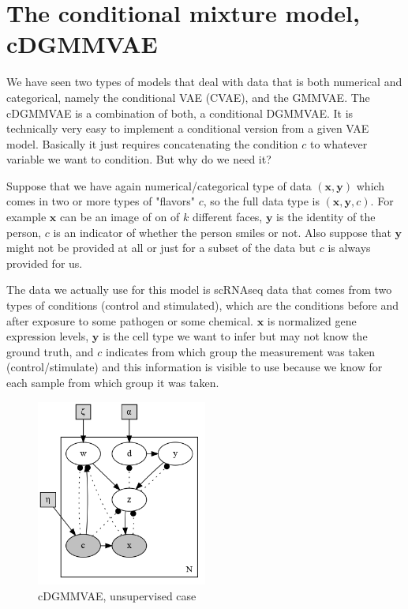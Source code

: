 \documentclass[11pt, a4paper]{report}
\theoremstyle{plain}
\theoremstyle{definition}
\theoremstyle{remark}
\newcommand{\x}{\mathbf{x}}
\newcommand{\y}{\mathbf{y}}
\begin{document}
\section{The conditional mixture model, cDGMMVAE}

We have seen two types of models that deal with data that is both numerical and
categorical, namely the conditional VAE (CVAE), and the GMMVAE.
The cDGMMVAE is a combination of both, a conditional DGMMVAE. 
It is technically very easy to implement a conditional version from a 
given VAE model. Basically it just requires 
concatenating the condition $c$ to whatever variable we want to condition.
But why do we need it?

Suppose that we have again numerical/categorical type of data $(\x, \y)$ which 
comes in two or more types of "flavors" $c$, so the full data type 
is $(\x, \y, c)$. For example $\x$ can be an image of on of $k$ 
different faces, 
$\y$ is the identity of the person, $c$ is an indicator of whether the person
smiles or not. 
Also suppose that $\y$ might not be provided at all or just for
a subset of the data but $c$ is always provided for us.

The data we actually use for this model is scRNAseq data that comes from two types 
of conditions (control and stimulated), 
which are the conditions before and after exposure to some pathogen or some chemical.
$\x$ is normalized gene expression levels, $\y$ is the cell type 
we want to infer but may not know the ground truth, and $c$ indicates from which
group the measurement was taken (control/stimulate) and this information is
visible to use because we know for each sample from which group it was
taken.


\begin{figure}[!hb]
\begin{framed}
\centering
\includegraphics[width=0.5\textwidth]{plots/dirichlet_gmm_cvae.gv.png}
\caption{cDGMMVAE, unsupervised case}
\label{fig:dirgmmcvae}
\end{framed}
\end{figure}
\end{document}
